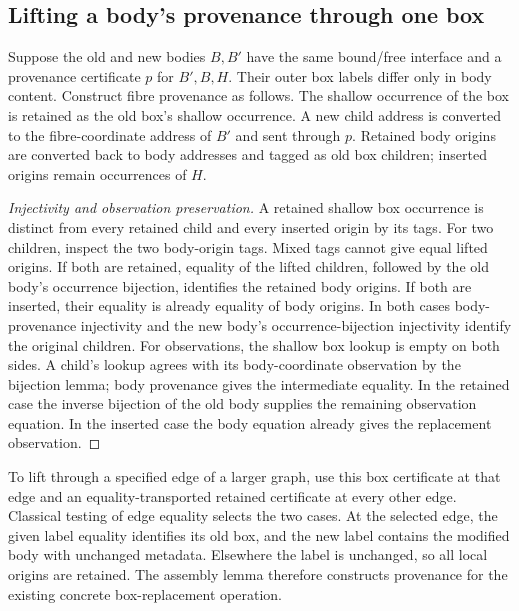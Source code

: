 \subsection{Lifting a body's provenance through one box}
Suppose the old and new bodies $B,B'$ have the same bound/free interface and a
provenance certificate $p$ for $B',B,H$. Their outer box labels differ only in
body content. Construct fibre provenance as follows. The shallow occurrence of
the box is retained as the old box's shallow occurrence. A new child address is
converted to the fibre-coordinate address of $B'$ and sent through $p$. Retained
body origins are converted back to body addresses and tagged as old box children;
inserted origins remain occurrences of $H$.
\begin{proof}[Injectivity and observation preservation]
A retained shallow box occurrence is distinct from every retained child and
every inserted origin by its tags. For two children, inspect the two body-origin
tags. Mixed tags cannot give equal lifted origins. If both are retained,
equality of the lifted children, followed by the old body's occurrence bijection,
identifies the retained body origins. If both are inserted, their equality is
already equality of body origins. In both cases body-provenance injectivity and
the new body's occurrence-bijection injectivity identify the original children.
For observations, the shallow box lookup is empty on both sides. A child's lookup
agrees with its body-coordinate observation by the bijection lemma; body
provenance gives the intermediate equality. In the retained case the inverse
bijection of the old body supplies the remaining observation equation. In the
inserted case the body equation already gives the replacement observation.
\end{proof}

To lift through a specified edge of a larger graph, use this box certificate at
that edge and an equality-transported retained certificate at every other edge.
Classical testing of edge equality selects the two cases. At the selected edge,
the given label equality identifies its old box, and the new label contains the
modified body with unchanged metadata. Elsewhere the label is unchanged, so all
local origins are retained. The assembly lemma therefore constructs provenance
for the existing concrete box-replacement operation.

